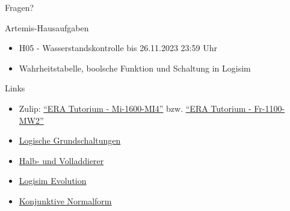 \documentclass[
  german,            %
  aspectratio=169,    %
]{tumbeamer}
\begin{document}
\begin{frame}[c]{}{}
  \begin{center}
    \LARGE Fragen?
  \end{center}
\end{frame}

\begin{frame}[c]{Artemis-Hausaufgaben}{}
  \begin{itemize}
    \item H05 - Wasserstandskontrolle bis 26.11.2023 23:59 Uhr
    \item Wahrheitstabelle, boolsche Funktion und Schaltung in Logisim
  \end{itemize}
\end{frame}

\begin{frame}[fragile, c]{Links}{}
  \begin{itemize}
    \item Zulip: \href{https://zulip.in.tum.de/#narrow/stream/1917-ERA-Tutorium---Mi-1600-MI4}{\enquote{ERA Tutorium - Mi-1600-MI4}}
    bzw. \href{https://zulip.in.tum.de/#narrow/stream/1940-ERA-Tutorium---Fr-1100-MW2}{\enquote{ERA Tutorium - Fr-1100-MW2}}
    \item \href{https://www.elektronik-kompendium.de/sites/dig/2609191.htm}{Logische Grundschaltungen}
    \item \href{https://www.elektronik-kompendium.de/sites/dig/0209031.htm}{Halb- und Volladdierer}
    \item \href{https://github.com/logisim-evolution/logisim-evolution/releases}{Logisim Evolution}
    \item \href{https://www.biancahoegel.de/logik/normalform_konjunktiv.html}{Konjunktive Normalform}
  \end{itemize}
\end{frame}

\maketitle
\end{document}
